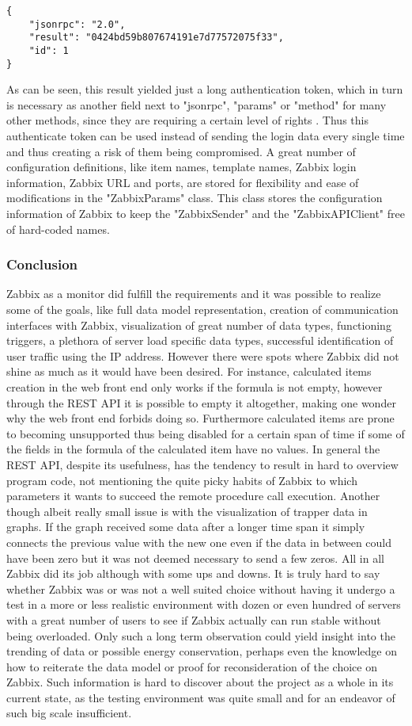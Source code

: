 	\begin{lstlisting}[language=json_sw]
{
    "jsonrpc": "2.0",
    "result": "0424bd59b807674191e7d77572075f33",
    "id": 1
}
\end{lstlisting}
	As can be seen, this result yielded just a long authentication token, which in turn is necessary as another field next to "jsonrpc", "params" or "method" for many other methods, since they are requiring a certain level of rights \cite{zab3}. Thus this authenticate token can be used instead of sending the login data every single time and thus creating a risk of them being compromised.
	A great number of configuration definitions, like item names, template names, Zabbix login information, Zabbix URL and ports, are stored for flexibility and ease of modifications in the "ZabbixParams" class. This class stores the configuration information of Zabbix to keep the "ZabbixSender" and the "ZabbixAPIClient" free of hard-coded names.
\subsubsection{Conclusion}
	Zabbix as a monitor did fulfill the requirements and it was possible to realize some of the goals, like full data model representation, creation of communication interfaces with Zabbix, visualization of great number of data types, functioning triggers, a plethora of server load specific data types, successful identification of user traffic using the IP address. However there were spots where Zabbix did not shine as much as it would have been desired. For instance, calculated items creation in the web front end only works if the formula is not empty, however through the REST API it is possible to empty it altogether, making one wonder why the web front end forbids doing so. Furthermore calculated items are prone to becoming unsupported thus being disabled for a certain span of time if some of the fields in the formula of the calculated item have no values. In general the REST API, despite its usefulness, has the tendency to result in hard to overview program code, not mentioning the quite picky habits of Zabbix to which parameters it wants to succeed the remote procedure call execution. Another though albeit really small issue is with the visualization of trapper data in graphs. If the graph received some data after a longer time span it simply connects the previous value with the new one even if the data in between could have been zero but it was not deemed necessary to send a few zeros.
	All in all Zabbix did its job although with some ups and downs. It is truly hard to say whether Zabbix was or was not a well suited choice without having it undergo a test in a more or less realistic environment with dozen or even hundred of servers with a great number of users to see if Zabbix actually can run stable without being overloaded. Only such a long term observation could yield insight into the trending of data or possible energy conservation, perhaps even the knowledge on how to reiterate the data model or proof for reconsideration of the choice on Zabbix. Such information is hard to discover about the project as a whole in its current state, as the testing environment was quite small and for an endeavor of such big scale insufficient.